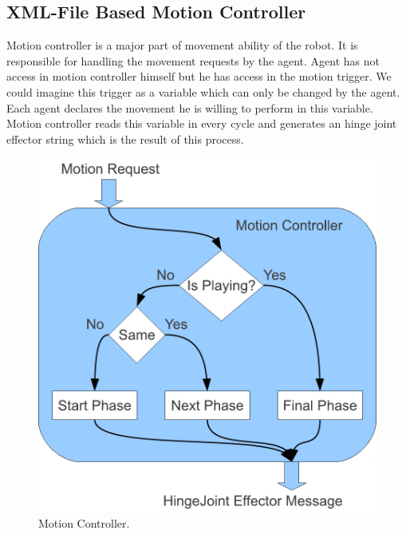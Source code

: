 \subsection{XML-File Based Motion Controller}
Motion controller is a major part of movement ability of the robot. It is responsible for handling the movement requests by the agent. Agent has not access in motion controller himself but he has access in the motion trigger. We could imagine this trigger as a variable which can only be changed by the agent. Each agent declares the movement he is willing to perform in this variable.
Motion controller reads this variable in every cycle and generates an hinge joint effector string which is the result of this process.
\begin{figure}[htb!]
\centering
  \includegraphics[scale=0.6]{Chapter3/figures/MotionController.pdf}
  \caption{Motion Controller.}
  \label{fig:MotionController}
\end{figure}


